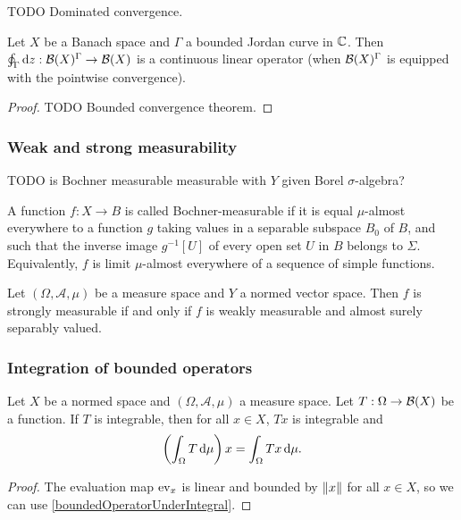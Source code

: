 TODO Dominated convergence.

\begin{lemma} \label{pathIntegralContinuousOperator}
Let $X$ be a Banach space and $\Gamma$ a bounded Jordan curve in $\mathbb{C}$. Then $\oint_\Gamma\operatorname{d \!}{z}: \operatorname{\mathcal{B}}(X)^\Gamma \to \operatorname{\mathcal{B}}(X)$ is a continuous linear operator (when $\operatorname{\mathcal{B}}(X)^\Gamma$ is equipped with the pointwise convergence).
\end{lemma}
\begin{proof}
TODO Bounded convergence theorem.
\end{proof}

\subsubsection{Weak and strong measurability}
TODO is Bochner measurable measurable with $Y$ given Borel $\sigma$-algebra?

A function $f:X\to B$ is called Bochner-measurable if it is equal $\mu$-almost everywhere to a function $g$ taking values in a separable subspace $B_{0}$ of $B$, and such that the inverse image $g^{-1}[U]$ of every open set $U$ in $B$ belongs to $\Sigma$. Equivalently, $f$ is limit $\mu$-almost everywhere of a sequence of simple functions. 

\begin{theorem}
Let $(\Omega, \mathcal{A},\mu)$ be a measure space and $Y$ a normed vector space. Then $f$ is strongly measurable \textup{if and only if} $f$ is weakly measurable and almost surely separably valued.
\end{theorem}

\subsubsection{Integration of bounded operators}
\begin{lemma} \label{integralBoundedOperator}
Let $X$ be a normed space and $(\Omega, \mathcal{A},\mu)$ a measure space. Let $T: \Omega \to \operatorname{\mathcal{B}}(X)$ be a function. If $T$ is integrable, then for all $x\in X$, $Tx$ is integrable and
\[ \left(\int_\Omega T\operatorname{d \!}{\mu}\right)x = \int_\Omega Tx\operatorname{d \!}{\mu}. \]
\end{lemma}
\begin{proof}
The evaluation map $\operatorname{ev}_x$ is linear and bounded by $\lVert x\rVert$ for all $x\in X$, so we can use \ref{boundedOperatorUnderIntegral}.
\end{proof}



